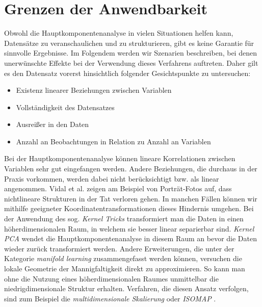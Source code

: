 

\section{Grenzen der Anwendbarkeit} \label{theo_results}

Obwohl die Hauptkomponentenanalyse in vielen Situationen helfen kann, Datensätze zu veranschaulichen und zu strukturieren, gibt es keine Garantie für sinnvolle Ergebnisse. Im Folgendem werden wir Szenarien beschreiben, bei denen unerwünschte Effekte bei der Verwendung dieses Verfahrens auftreten. Daher gilt es den Datensatz vorerst hinsichtlich folgender Gesichtspunkte zu untersuchen: 

\begin{itemize}
\item Existenz linearer Beziehungen zwischen Variablen
\item Vollständigkeit des Datensatzes
\item Ausreißer in den Daten
\item Anzahl an Beobachtungen in Relation zu Anzahl an Variablen
\end{itemize}

Bei der Hauptkomponentenanalyse können lineare Korrelationen zwischen Variablen sehr gut eingefangen werden. Andere Beziehungen, die durchaus in der Praxis vorkommen, werden dabei nicht berücksichtigt bzw. als linear angenommen. Vidal et al. \cite{vidal} zeigen am Beispiel von Porträt-Fotos auf, dass nichtlineare Strukturen in der Tat verloren gehen. In manchen Fällen können wir mithilfe geeigneter Koordinatentransformationen dieses Hindernis umgehen. Bei der Anwendung des sog. \textit{Kernel Tricks} transformiert man die Daten in einen höherdimensionalen Raum, in welchem sie besser linear separierbar sind. \textit{Kernel PCA} wendet die Hauptkomponentenanalyse in diesem Raum an bevor die Daten wieder zurück transformiert werden. Andere Erweiterungen, die unter der Kategorie \textit{manifold learning} zusammengefasst werden können, versuchen die lokale Geometrie der Mannigfaltigkeit direkt zu approximieren. So kann man ohne die Nutzung eines höherdimensionalen Raumes unmittelbar die niedrigdimensionale Struktur erhalten. Verfahren, die diesen Ansatz verfolgen, sind zum Beispiel die \textit{multidimensionale Skalierung} oder \textit{ISOMAP} \cite{lee}.

